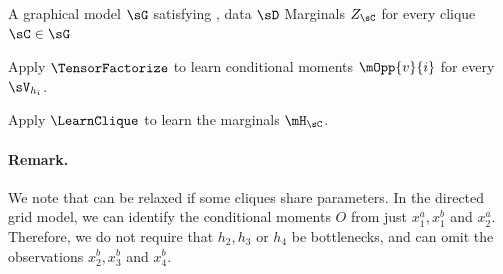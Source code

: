 \renewcommand{\algorithmicrequire}{\textbf{Input:}}
\renewcommand{\algorithmicensure}{\textbf{Output:}}
\begin{algorithm}
  \caption{\LearnMarginals}
  \label{algo:directed}
  \begin{algorithmic}
    \REQUIRE A graphical model $\sG$ satisfying , data $\sD$
    \ENSURE Marginals $Z_\sC$ for every clique $\sC \in \sG$

        \STATE Apply $\TensorFactorize$ to learn conditional moments
        $\mOpp{v}{i}$ for every $\sV_{h_i}$.

      \ENDFOR
\STATE Apply $\LearnClique$ to learn the marginals $\mH_\sC$.
\ENDFOR
  \end{algorithmic}
\end{algorithm}

\paragraph{Remark.} We note that  can be relaxed if some cliques
  share parameters.
In the directed grid model, we can identify the conditional moments $O$ from just
  $x^a_1, x^b_1$ and $x^a_2$.
  Therefore, we do not require that $h_2, h_3$ or $h_4$
  be bottlenecks, and can omit the observations $x^b_2, x^b_3$ and $x^b_4$.

